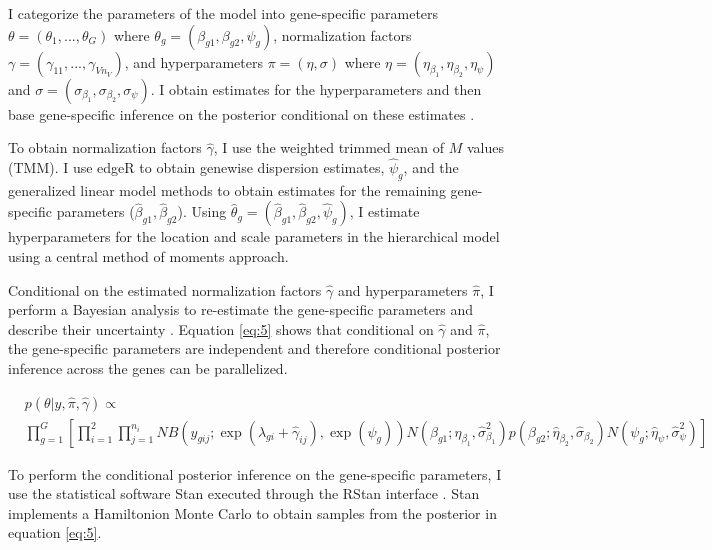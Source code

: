 I categorize the parameters of the model into gene-specific parameters $\theta = (\theta_1, ..., \theta_G)$ where $\theta_g = (\beta_{g1}, \beta_{g2}, \psi_g)$, normalization factors $\gamma = (\gamma_{11}, ..., \gamma_{V n_V})$, and hyperparameters $\pi = (\eta, \sigma)$ where $\eta = (\eta_{\beta_1}, \eta_{\beta_2}, \eta_\psi)$ and $\sigma = (\sigma_{\beta_1}, \sigma_{\beta_2}, \sigma_\psi)$. I obtain estimates for the hyperparameters and then base gene-specific inference on the posterior conditional on these estimates \citep{niemi2015empirical}.

To obtain normalization factors $\hat{\gamma}$, I use the weighted trimmed mean of $M$ values (TMM). I use edgeR to obtain genewise dispersion estimates, $\hat{\psi}_g$, and the generalized linear model methods to obtain estimates for the remaining gene-specific parameters ($\hat{\beta}_{g1}, \hat{\beta}_{g2}$)\citep{robinson2010scaling}. Using $\hat{\theta}_g = (\hat{\beta}_{g1} , \hat{\beta}_{g2}, \hat{\psi}_g)$, I estimate hyperparameters for the location and scale parameters in the hierarchical model using a central method of moments approach. 

Conditional on the estimated normalization factors $\hat{\gamma}$ and hyperparameters $\hat{\pi}$, I perform a Bayesian analysis to re-estimate the gene-specific parameters and describe their uncertainty \citep{niemi2015empirical}. Equation \ref{eq:5} shows that conditional on $\hat{\gamma}$ and $\hat{\pi}$, the gene-specific parameters are independent and therefore conditional posterior inference across the genes can be parallelized. 

\begin{equation}
\label{eq:5}
\begin{split}
& p(\theta | y, \hat{\pi}, \hat{\gamma})  \propto \\ & \prod_{g=1}^{G} \left[ \prod_{i=1}^{2} \prod_{j=1}^{n_i} NB(y_{gij} ; \exp(\lambda_{gi} + \hat{\gamma}_{ij}), \exp(\psi_g)) N(\beta_{g1} ; \hat{\eta}_{\beta_1}, \hat{\sigma}^2_{\beta_1}) p(\beta_{g2} ; \hat{\eta}_{\beta_2}, \hat{\sigma}_{\beta_2}) N(\psi_g ; \hat{\eta}_{\psi}, \hat{\sigma}^2_{\psi})  \right]
\end{split}
\end{equation}

To perform the conditional posterior inference on the gene-specific parameters, I use the statistical software Stan \citep{stan2014stan} executed through the RStan interface \citep{team2016rstan}. Stan implements a Hamiltonion Monte Carlo \citep{neal2011mcmc} to obtain samples from the posterior in equation \ref{eq:5}. 



